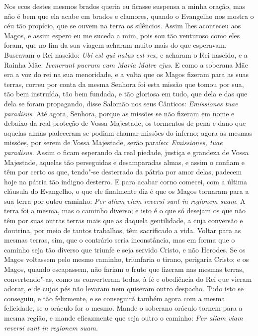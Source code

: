 Nos ecos destes mesmos brados queria eu ficasse suspensa a minha oração,
mas não é bem que ela acabe em brados e clamores, quando o Evangelho nos
mostra o céu tão propício, que se ouvem na terra os silêncios. Assim
lhes aconteceu aos Magos, e assim espero eu me suceda a mim, pois sou
tão venturoso como eles foram, que no fim da sua viagem acharam muito
mais do que esperavam. Buscavam o Rei nascido: \emph{Ubi est qui natus
est rex}, e acharam o Rei nascido, e a Rainha Mãe:
\emph{Ivenerunt puerum cum Maria Matre ejus}. E como a
soberana Mãe era a voz do rei na sua menoridade, e a volta que os Magos
fizeram para as suas terras, correu por conta da mesma Senhora foi esta
missão que tomou por sua, tão bem instruída, tão bem fundada, e tão
gloriosa em tudo, que dela e das que dela se foram propagando, disse
Salomão nos seus Cânticos: \emph{Emissiones tuae paradisus}.
Até agora, Senhora, porque as missões se
não fizeram em nome e debaixo da real proteção de Vossa Majestade, os
tormentos de pena e dano que aquelas almas padeceram se podiam chamar
missões do inferno; agora as mesmas missões, por serem de Vossa
Majestade, serão paraíso: \emph{Emissiones, tuae paradisus.} Assim o
ficam esperando da real piedade, justiça e grandeza de Vossa Majestade,
aquelas tão perseguidas e desamparadas almas, e assim o confiam e têm
por certo os que, tendo"-se desterrado da pátria por amor delas, padecem
hoje na pátria tão indigno desterro. E para acabar corno comecei, com a
última cláusula do Evangelho, o que ele finalmente diz é que os Magos
tornaram para a sua terra por outro caminho: \emph{Per aliam viam
reversi sunt in regionem suam}. A terra foi a mesma, mas o
caminho diverso; e isto é o que só desejam os que não têm por suas
outras terras mais que as daquela gentilidade, a cuja conversão e
doutrina, por meio de tantos trabalhos, têm sacrificado a vida. Voltar
para as mesmas terras, sim, que o contrário seria inconstância, mas em
forma que o caminho seja tão diverso que triunfe e seja servido Cristo,
e não Herodes. Se os Magos voltassem pelo mesmo caminho, triunfaria o
tirano, perigaria Cristo; e os Magos, quando escapassem, não fariam o
fruto que fizeram nas mesmas terras, convertendo"-as, como as converteram
todas, à fé e obediência do Rei que vieram adorar, e de cujos pés não
levaram nem quiseram outro despacho. Tudo isto se conseguiu, e tão
felizmente, e se conseguirá também agora com a mesma felicidade, se o
oráculo for o mesmo. Mande o soberano oráculo tornem para a mesma
região, e mande eficazmente que seja outro o caminho: \emph{Per aliam
viam reversi sunt in regionem suam.}

